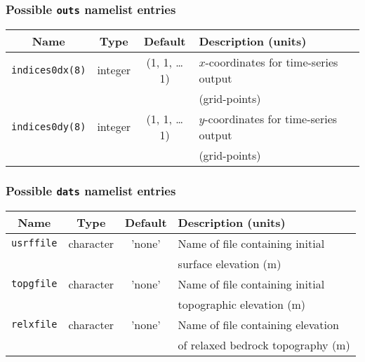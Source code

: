 \subsubsection{Possible \texttt{outs} namelist entries}
%
\begin{center}
\begin{tabular}{|c|c|c|l|}
\hline
Name & Type & Default & Description (units)\\
\hline
\hline
\texttt{indices0dx(8)} & integer & (1, 1, \ldots 1) & $x$-coordinates for
time-series output \\
 & & & (grid-points) \\
\hline
\texttt{indices0dy(8)} & integer & (1, 1, \ldots 1) & $y$-coordinates for
time-series output \\
 & & & (grid-points) \\
\hline
\end{tabular}
\end{center}
%
\subsubsection{Possible \texttt{dats} namelist entries}
%
\begin{center}
\begin{tabular}{|c|c|c|l|}
\hline
Name & Type & Default & Description (units)\\
\hline
\hline
\texttt{usrffile} & character & 'none' & Name of file containing initial  \\
 & & & surface elevation (m) \\
\hline
\texttt{topgfile} & character & 'none' & Name of file containing initial \\
 & & & topographic elevation (m) \\
\hline
\texttt{relxfile} & character & 'none' & Name of file containing elevation \\
 & & & of relaxed bedrock topography (m) \\ 
\hline
\end{tabular}
\end{center}
%
